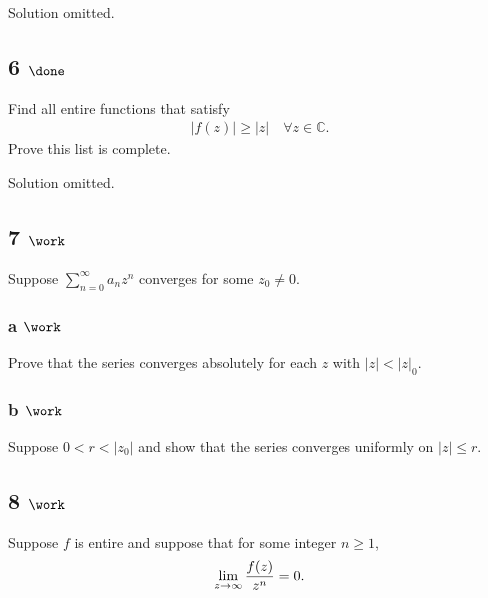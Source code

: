 Solution omitted.

\hypertarget{done-5}{%
\subsection{\texorpdfstring{6
\(\done\)}{6 \textbackslash done}}\label{done-5}}

Find all entire functions that satisfy
\begin{align*}
{\left\lvert {f(z)} \right\rvert} \geq {\left\lvert {z} \right\rvert} \quad \forall z\in {\mathbb{C}}
.\end{align*}
Prove this list is complete.

Solution omitted.

\hypertarget{work-38}{%
\subsection{\texorpdfstring{7
\(\work\)}{7 \textbackslash work}}\label{work-38}}

Suppose \(\sum_{n=0}^\infty a_n z^n\) converges for some \(z_0 \neq 0\).

\hypertarget{a-work-4}{%
\subsubsection{\texorpdfstring{a
\(\work\)}{a \textbackslash work}}\label{a-work-4}}

Prove that the series converges absolutely for each \(z\) with
\({\left\lvert {z} \right\rvert} < {\left\lvert {z} \right\rvert}_0\).

\hypertarget{b-work-6}{%
\subsubsection{\texorpdfstring{b
\(\work\)}{b \textbackslash work}}\label{b-work-6}}

Suppose \(0 < r < {\left\lvert {z_0} \right\rvert}\) and show that the
series converges uniformly on \({\left\lvert {z} \right\rvert} \leq r\).

\hypertarget{work-39}{%
\subsection{\texorpdfstring{8
\(\work\)}{8 \textbackslash work}}\label{work-39}}

Suppose \(f\) is entire and suppose that for some integer \(n\geq 1\),
\begin{align*}
\lim_{z\to \infty} {f(z) \over z^n} = 0
.\end{align*}

